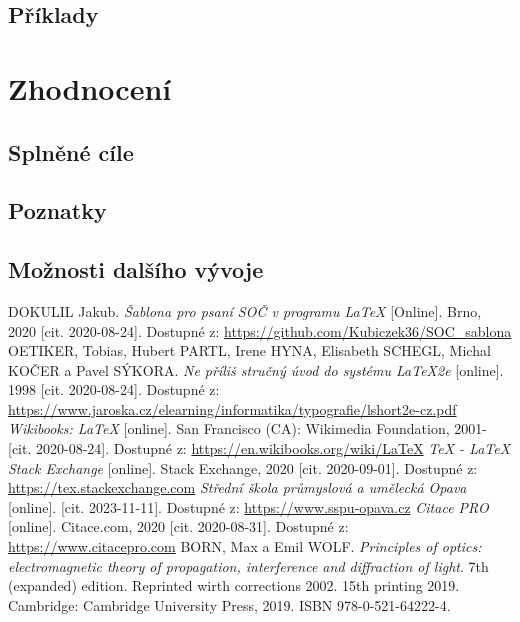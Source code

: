 \documentclass[12pt, a4paper,
twoside,        %
openright
]{report}
\begin{document}
\section{Příklady}

\chapter{Zhodnocení}

\section{Splněné cíle}

\section{Poznatky}

\section{Možnosti dalšího vývoje}




	
	\begin{thebibliography}{99}
		 DOKULIL Jakub. \textit{Šablona pro psaní SOČ v programu \LaTeX} [Online]. Brno, 2020 [cit. 2020-08-24]. Dostupné z: \url{https://github.com/Kubiczek36/SOC_sablona}
		OETIKER, Tobias, Hubert PARTL, Irene HYNA, Elisabeth SCHEGL, Michal KOČER a Pavel SÝKORA. \textit{Ne příliš stručný úvod do systému LaTeX2e} [online]. 1998 [cit. 2020-08-24]. Dostupné z: \url{https://www.jaroska.cz/elearning/informatika/typografie/lshort2e-cz.pdf}
		\textit{Wikibooks: LaTeX} [online]. San Francisco (CA): Wikimedia Foundation, 2001- [cit. 2020-08-24]. Dostupné z: \url{https://en.wikibooks.org/wiki/LaTeX}
		 \textit{TeX - LaTeX Stack Exchange} [online]. Stack Exchange, 2020 [cit. 2020-09-01]. Dostupné z: \url{https://tex.stackexchange.com}
		 \textit{Střední škola průmyslová a umělecká Opava} [online]. [cit. 2023-11-11]. Dostupné z: \url{https://www.sspu-opava.cz}
		\textit{Citace PRO} [online]. Citace.com, 2020 [cit. 2020-08-31]. Dostupné z: \url{https://www.citacepro.com}
		 BORN, Max a Emil WOLF. \textit{Principles of optics: electromagnetic theory of propagation, interference and diffraction of light}. 7th (expanded) edition. Reprinted wirth corrections 2002. 15th printing 2019. Cambridge: Cambridge University Press, 2019. ISBN 978-0-521-64222-4.
	\end{thebibliography}
	
	\listoffigures
	
	\listoftables
	
	\appendix %
	
	[\vspace{-22pt}] %
	

	
	
\end{document}
